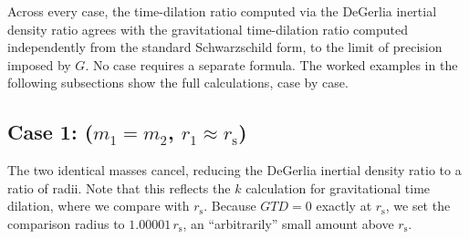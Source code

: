 \documentclass[twoside,twocolumn,9pt,fleqn]{article}
\begin{document}
Across every case, the time-dilation ratio computed via the DeGerlia inertial density ratio agrees with the gravitational time-dilation ratio computed independently from the standard Schwarzschild form, to the limit of precision imposed by $G$. No case requires a separate formula. The worked examples in the following subsections show the full calculations, case by case.

\newpage
\subsection{Case 1: ($m_1 = m_2$, $r_1 \approx r_{\mathrm{s}}$)}
\label{subsec:example_static_mass_table_case_1}

The two identical masses cancel, reducing the DeGerlia inertial density ratio to a ratio of radii.
Note that this reflects the $k$ calculation for gravitational time dilation, where we compare with $r_{\mathrm{s}}$. Because $GTD = 0$ exactly at $r_{\mathrm{s}}$, we set the comparison radius to $1.00001\,r_{\mathrm{s}}$, an ``arbitrarily'' small amount above $r_{\mathrm{s}}$.
\end{document}
